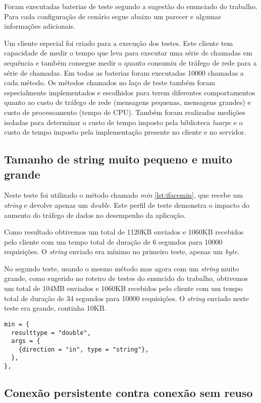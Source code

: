\documentclass[11pt]{article}
\begin{document}
Foram executadas baterias de teste segundo a sugestão do enunciado do trabalho.
Para cada configuração de cenário segue abaixo um parecer e algumas informações
adicionais.

Um cliente especial foi criado para a execução dos testes. Este cliente tem
capacidade de medir o tempo que leva para executar uma série de chamadas em
sequência e também consegue medir o quanto consumiu de tráfego de rede para a
série de chamadas. Em todas as baterias foram executadas 10000 chamadas a cada
método. Os métodos chamados no laço de teste também foram especialmente
implementados e escolhidos para terem diferentes comportamentos quanto ao custo
de tráfego de rede (mensagens pequenas, mensagens grandes) e custo de
processamento (tempo de CPU). Também foram realizadas medições isoladas para
determinar o custo de tempo imposto pela biblioteca \textit{luarpc} e o custo de
tempo imposto pela implementação presente no cliente e no servidor.

\subsection{Tamanho de string muito pequeno e muito grande}\label{subsec:stringsize}

Neste teste foi utilizado o método chamado \textit{min} \ref{lst:ifacemin}, que
recebe um \textit{string} e devolve apenas um \textit{double}. Este perfil de
teste demonstra o impacto do aumento do tráfego de dados no desempenho da
aplicação.

Como resultado obtivemos um total de 1120KB enviados e 1060KB recebidos pelo
cliente com um tempo total de duração de 6 segundos para 10000 requisições. O
\textit{string} enviado era mínimo no primeiro teste, apenas um \textit{byte}.

No segundo teste, usando o mesmo método mas agora com um \textit{string} muito
grande, como sugerido no roteiro de testes do enuncido do trabalho, obtivemos um
total de 104MB enviados e 1060KB recebidos pelo cliente com um tempo total de
duração de 34 segundos para 10000 requisições. O \textit{string} enviado neste
teste era grande, continha 10KB.

\begin{lstlisting}[caption={Interface min},label={lst:ifacemin}]
min = {
  resulttype = "double",
  args = {
    {direction = "in", type = "string"},
  },
},
\end{lstlisting}

\subsection{Conexão persistente contra conexão sem reuso}\label{subsec:persist}
\end{document}
